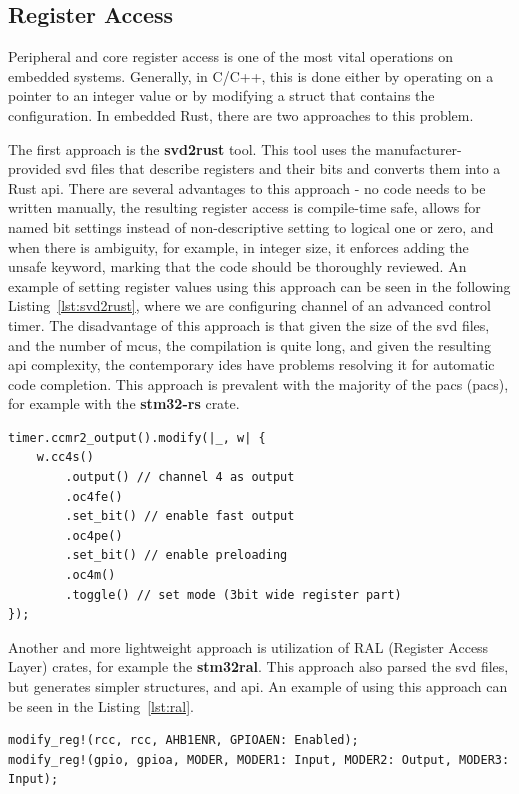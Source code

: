 \subsection{Register Access}
\label{subsec:register_access}
Peripheral and core register access is one of the most vital operations on embedded systems.
Generally, in C/C++, this is done either by operating on a pointer to an integer value or by modifying a struct that contains the configuration.
In embedded Rust, there are two approaches to this problem.

The first approach is the \textbf{svd2rust}\cite{rust_embedded_devices_wg_rust-embeddedsvd2rust_2021} tool.
This tool uses the manufacturer-provided \acs{svd} files that describe registers and their bits and converts them into a Rust \acs{api}.
There are several advantages to this approach - no code needs to be written manually, the resulting register access is compile-time safe, allows for named bit settings instead of non-descriptive setting to logical one or zero, and when there is ambiguity, for example, in integer size, it enforces adding the unsafe keyword, marking that the code should be thoroughly reviewed.
An example of setting register values using this approach can be seen in the following Listing~\ref{lst:svd2rust}, where we are configuring channel of an advanced control timer.
The disadvantage of this approach is that given the size of the \acs{svd} files, and the number of \acs{mcu}s, the compilation is quite long, and given the resulting \acs{api} complexity, the contemporary \acs{ide}s have problems resolving it for automatic code completion.
This approach is prevalent with the majority of the \acs{pac}s (\acl{pac}s), for example with the \textbf{stm32-rs} crate\cite{noauthor_stm32-rsstm32-rs_2021}.

\newpage
\begin{lstlisting}[caption={Using svd2rust generated API for register access.},label=lst:svd2rust]
timer.ccmr2_output().modify(|_, w| {
    w.cc4s()
        .output() // channel 4 as output
        .oc4fe()
        .set_bit() // enable fast output
        .oc4pe()
        .set_bit() // enable preloading
        .oc4m()
        .toggle() // set mode (3bit wide register part)
});
\end{lstlisting}

Another and more lightweight approach is utilization of RAL (Register Access Layer) crates, for example the \textbf{stm32ral}\cite{greig_adamgreigstm32ral_2021}.
This approach also parsed the \acs{svd} files, but generates simpler structures, and \acs{api}.
An example of using this approach can be seen in the Listing~\ref{lst:ral}.
\begin{lstlisting}[caption={Using RAL API for register access\cite{greig_adamgreigstm32ral_2021}.},label=lst:ral]
modify_reg!(rcc, rcc, AHB1ENR, GPIOAEN: Enabled);
modify_reg!(gpio, gpioa, MODER, MODER1: Input, MODER2: Output, MODER3: Input);
\end{lstlisting}

